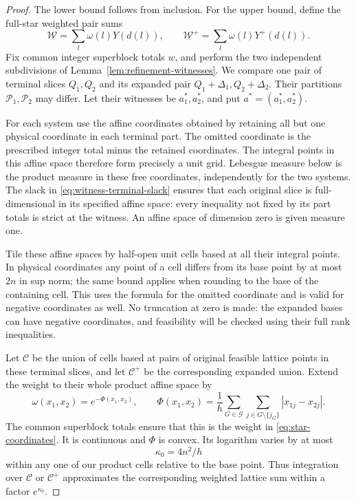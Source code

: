 \begin{proof}
The lower bound follows from inclusion.  For the upper bound,
define the full-star weighted pair sums
\[
 \mathcal W=\sum_l\omega(l)Y(d(l)),\qquad
 \mathcal W^+=\sum_l\omega(l)Y^+(d(l)).
\]
Fix common integer superblock totals \(w\), and perform the two
independent subdivisions of Lemma~\ref{lem:refinement-witnesses}.
We compare one pair of terminal slices \(Q_1,Q_2\) and its
expanded pair \(Q_1+\Delta_1,Q_2+\Delta_2\).  Their partitions
\(\mathcal P_1,\mathcal P_2\) may differ.  Let their witnesses
be \(a_1^*,a_2^*\), and put \(a^*=(a_1^*,a_2^*)\).

For each system use the affine coordinates obtained by retaining
all but one physical coordinate in each terminal part.  The
omitted coordinate is the prescribed integer total minus the
retained coordinates.  The integral points in this affine space
therefore form precisely a unit grid.  Lebesgue measure below is
the product measure in these free coordinates, independently for
the two systems.  The slack in
\eqref{eq:witness-terminal-slack} ensures that each original
slice is full-dimensional in its specified affine space: every
inequality not fixed by its part totals is strict at the witness.
An affine space of dimension zero is given measure one.

Tile these affine spaces by half-open unit cells based at all
their integral points.  In physical coordinates any point of a
cell differs from its base point by at most \(2n\) in sup norm;
the same bound applies when rounding to the base of the containing
cell.  This uses the formula for the omitted coordinate and is
valid for negative coordinates as well.  No truncation at zero is
made: the expanded bases can have negative coordinates, and
feasibility will be checked using their full rank inequalities.

Let \(\mathcal C\) be the union of cells based at pairs of
original feasible lattice points in these terminal slices, and
let \(\mathcal C^+\) be the corresponding expanded union.
Extend the weight to their whole product affine space by
\[
 \omega(x_1,x_2)=e^{-\Phi(x_1,x_2)},\qquad
 \Phi(x_1,x_2)=\frac1h\sum_{G\in\mathcal G}
            \sum_{j\in G\setminus\{j_G\}}|x_{1j}-x_{2j}|.
\]
The common superblock totals ensure that this is the weight in
\eqref{eq:star-coordinates}.  It is continuous and \(\Phi\) is
convex.  Its logarithm varies by at most
\begin{equation}\label{eq:cell-weight-variation}
 \kappa_0=4n^2/h
\end{equation}
within any one of our product cells relative to the base point.
Thus integration over \(\mathcal C\) or \(\mathcal C^+\)
approximates the corresponding weighted lattice sum within a
factor \(e^{\kappa_0}\).


\end{proof}
